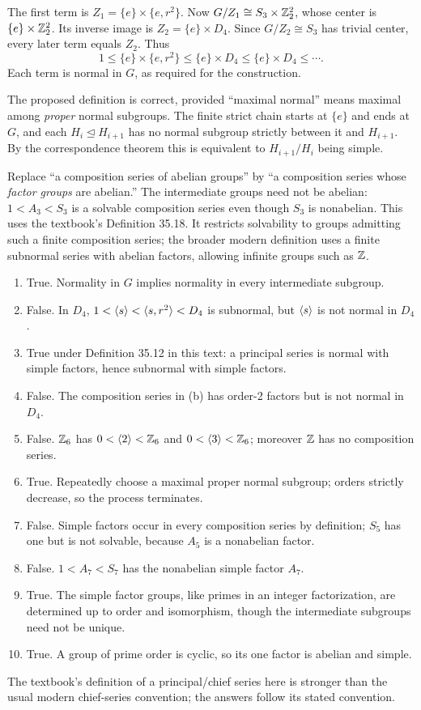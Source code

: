 The first term is $Z_1=\{e\}\times\{e,r^2\}$.
Now $G/Z_1\cong S_3\times\mathbb{Z}_2^2$, whose center is $\{e\}\times\mathbb{Z}_2^2$. Its inverse image is $Z_2=\{e\}\times D_4$.
Since $G/Z_2\cong S_3$ has trivial center, every later term equals $Z_2$. Thus
\[
1\le\{e\}\times\{e,r^2\}\le\{e\}\times D_4
\le\{e\}\times D_4\le\cdots.
\]
Each term is normal in $G$, as required for the construction.

The proposed definition is correct, provided ``maximal normal'' means maximal among \emph{proper} normal subgroups. The finite strict chain starts at $\{e\}$ and ends at $G$, and each $H_i\trianglelefteq H_{i+1}$ has no normal subgroup strictly between it and $H_{i+1}$. By the correspondence theorem this is equivalent to $H_{i+1}/H_i$ being simple.

Replace ``a composition series of abelian groups'' by ``a composition series whose \emph{factor groups} are abelian.'' The intermediate groups need not be abelian: $1<A_3<S_3$ is a solvable composition series even though $S_3$ is nonabelian.
This uses the textbook's Definition 35.18. It restricts solvability to groups admitting such a finite composition series; the broader modern definition uses a finite subnormal series with abelian factors, allowing infinite groups such as $\mathbb{Z}$.

\begin{enumerate}[label=\textbf{(\alph*)}]
\item True. Normality in $G$ implies normality in every intermediate subgroup.
\item False. In $D_4$, $1<\langle s\rangle<\langle s,r^2\rangle<D_4$ is subnormal, but $\langle s\rangle$ is not normal in $D_4$.
\item True under Definition 35.12 in this text: a principal series is normal with simple factors, hence subnormal with simple factors.
\item False. The composition series in (b) has order-2 factors but is not normal in $D_4$.
\item False. $\mathbb{Z}_6$ has $0<\langle 2\rangle<\mathbb{Z}_6$ and $0<\langle 3\rangle<\mathbb{Z}_6$; moreover $\mathbb{Z}$ has no composition series.
\item True. Repeatedly choose a maximal proper normal subgroup; orders strictly decrease, so the process terminates.
\item False. Simple factors occur in every composition series by definition; $S_5$ has one but is not solvable, because $A_5$ is a nonabelian factor.
\item False. $1<A_7<S_7$ has the nonabelian simple factor $A_7$.
\item True. The simple factor groups, like primes in an integer factorization, are determined up to order and isomorphism, though the intermediate subgroups need not be unique.
\item True. A group of prime order is cyclic, so its one factor is abelian and simple.
\end{enumerate}
The textbook's definition of a principal/chief series here is stronger than the usual modern chief-series convention; the answers follow its stated convention.

